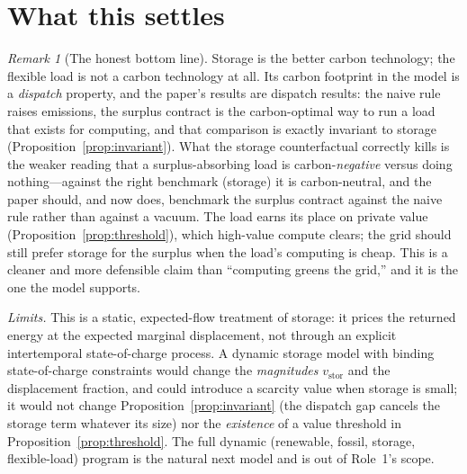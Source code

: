 \documentclass[11pt,reqno]{amsart}
\theoremstyle{plain}\newtheorem{proposition}{Proposition}\newtheorem{corollary}[proposition]{Corollary}
\theoremstyle{remark}\newtheorem{remark}[proposition]{Remark}
\begin{document}
\section{What this settles}
\begin{remark}[The honest bottom line]
Storage is the better carbon technology; the flexible load is not a carbon technology at all.
Its carbon footprint in the model is a \emph{dispatch} property, and the paper's results are
dispatch results: the naive rule raises emissions, the surplus contract is the carbon-optimal
way to run a load that exists for computing, and that comparison is exactly invariant to
storage (Proposition~\ref{prop:invariant}). What the storage counterfactual correctly kills is
the weaker reading that a surplus-absorbing load is carbon-\emph{negative} versus doing
nothing---against the right benchmark (storage) it is carbon-neutral, and the paper should, and
now does, benchmark the surplus contract against the naive rule rather than against a vacuum.
The load earns its place on private value (Proposition~\ref{prop:threshold}), which high-value
compute clears; the grid should still prefer storage for the surplus when the load's computing
is cheap. This is a cleaner and more defensible claim than ``computing greens the grid,'' and
it is the one the model supports.
\end{remark}
\emph{Limits.} This is a static, expected-flow treatment of storage: it prices the returned
energy at the expected marginal displacement, not through an explicit intertemporal
state-of-charge process. A dynamic storage model with binding state-of-charge constraints
would change the \emph{magnitudes} $v_{\mathrm{stor}}$ and the displacement fraction, and could
introduce a scarcity value when storage is small; it would not change
Proposition~\ref{prop:invariant} (the dispatch gap cancels the storage term whatever its size)
nor the \emph{existence} of a value threshold in Proposition~\ref{prop:threshold}. The full
dynamic (renewable, fossil, storage, flexible-load) program is the natural next model and is
out of Role~1's scope.
\end{document}
